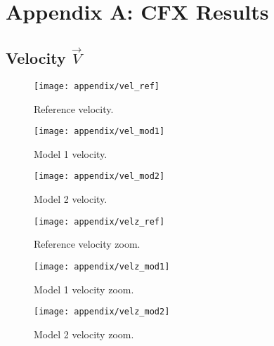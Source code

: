 \chapter{Appendix A: CFX Results}
\label{appendix:cfx}
\hypertarget{appendixa}{}

\renewcommand{\thesection}{A.\arabic{section}}
\renewcommand\thefigure{A.\arabic{figure}} 

\section{Velocity $\vec{V}$}
\begin{figure}[H]
    	\centering
        \texttt{[image: appendix/vel\_ref]}
        \caption{Reference velocity.}
        \label{fig:vel_ref}
\end{figure}
\begin{figure}[H]
    	\centering
        \texttt{[image: appendix/vel\_mod1]}
        \caption{Model 1 velocity.}
        \label{fig:vel_mod1}
\end{figure}
\begin{figure}[H]
    	\centering
        \texttt{[image: appendix/vel\_mod2]}
        \caption{Model 2 velocity.}
        \label{fig:vel_mod2}
\end{figure}

\begin{figure}[H]
    	\centering
        \texttt{[image: appendix/velz\_ref]}
        \caption{Reference velocity zoom.}
        \label{fig:velz_ref}
\end{figure}
\begin{figure}[H]
    	\centering
        \texttt{[image: appendix/velz\_mod1]}
        \caption{Model 1 velocity zoom.}
        \label{fig:velz_mod1}
\end{figure}
\begin{figure}[H]
    	\centering
        \texttt{[image: appendix/velz\_mod2]}
        \caption{Model 2 velocity zoom.}
        \label{fig:velz_mod2}
\end{figure}

